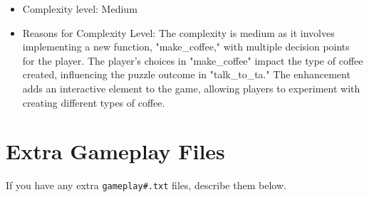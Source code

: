 \documentclass[11pt]{article}
\begin{document}
\begin{enumerate}
\begin{itemize}
    \item Complexity level: Medium


    \item Reasons for Complexity Level: The complexity is medium as it involves implementing a new function, "make\_coffee," with multiple decision points for the player.
    The player's choices in "make\_coffee" impact the type of coffee created, influencing the puzzle outcome in "talk\_to\_ta." The enhancement adds an interactive element to the game, allowing players to experiment with creating different types of coffee.

 \end{itemize}



\end{enumerate}


\section*{Extra Gameplay Files}

If you have any extra \texttt{gameplay\#.txt} files, describe them below.
\end{document}

